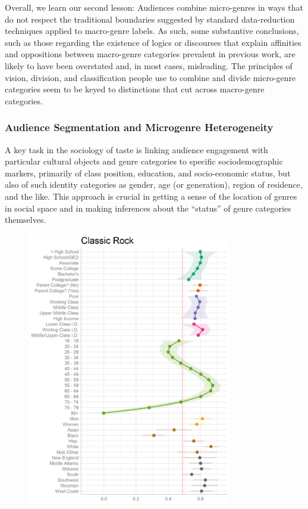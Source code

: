 \documentclass[a4paper,12pt]{extarticle}
\begin{document}
 Overall, we learn our second lesson: Audiences combine micro-genres in ways that do not respect the traditional boundaries suggested by standard data-reduction techniques applied to macro-genre labels. As such, some substantive conclusions, such as those regarding the existence of logics or discourses that explain affinities and oppositions between macro-genre categories prevalent in previous work, are likely to have been overstated and, in most cases, misleading. The principles of vision, division, and classification people use to combine and divide micro-genre categories seem to be keyed to distinctions that cut across macro-genre categories. 

 \subsubsection{Audience Segmentation and Microgenre Heterogeneity}
 A key task in the sociology of taste is linking audience engagement with particular cultural objects and genre categories to specific sociodemographic markers, primarily of class position, education, and socio-economic status, but also of such identity categories as gender, age (or generation), region of residence, and the like. This approach is crucial in getting a sense of the location of genres in social space and in making inferences about the ``status'' of genre categories themselves. 

\begin{figure}[ht!]
    \centering
    \includegraphics[width=0.8\textwidth]{Figs/Link Clust/classic-rock-macro-demog.png}
    \caption{}
    \label{fig:classic-rock-main}
\end{figure}
 
\end{document}
